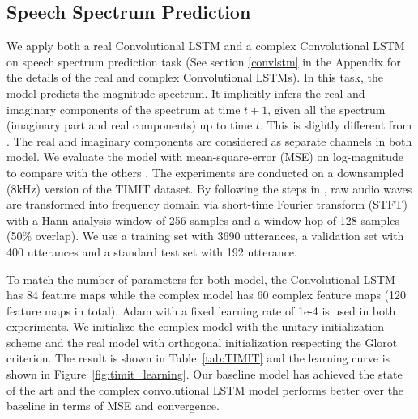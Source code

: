 \documentclass{article}
\begin{document}
\subsection{Speech Spectrum Prediction}
\label{sec:timit_results}
We apply both a real Convolutional LSTM \citet{xingjian2015convolutional} and a complex Convolutional LSTM on speech spectrum prediction task (See section \ref{convlstm} in the Appendix for the details of the real and complex Convolutional LSTMs). In this task, the model predicts the magnitude spectrum. It implicitly infers the real and imaginary components of the spectrum at time $t+1$, given all the spectrum (imaginary part and real components) up to time $t$. This is slightly different from \citep{wisdom2016full}. The real and imaginary components are considered as separate channels in both model. We evaluate the model with mean-square-error (MSE) on log-magnitude to compare with the others \citet{wisdom2016full}. The experiments are conducted on a downsampled (8kHz) version of the TIMIT dataset. By following the steps in \cite{wisdom2016full}, raw audio waves are transformed into frequency domain via short-time Fourier transform (STFT) with a Hann analysis window of 256 samples and a window hop of 128 samples (50\% overlap). We use a training set with 3690 utterances, a validation set with 400 utterances and a standard test set with 192 utterance. 

To match the number of parameters for both model, the Convolutional LSTM has 84 feature maps while the complex model has 60 complex feature maps (120 feature maps in total). Adam \cite{kingma2014adam} with a fixed learning rate of 1e-4 is used in both experiments. We initialize the complex model with the unitary initialization scheme and the real model with orthogonal initialization respecting the Glorot criterion. The result is shown in Table~\ref{tab:TIMIT} and the learning curve is shown in Figure~\ref{fig:timit_learning}. Our baseline model has achieved the state of the art and the complex convolutional LSTM model performs better over the baseline in terms of MSE and convergence. 
\end{document}
